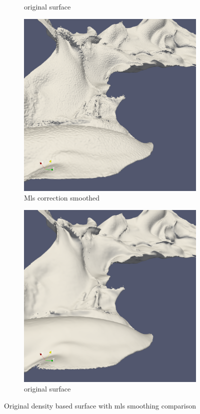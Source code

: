 \begin{figure}
\begin{center}
\begin{subfigure}[b]{0.47\textwidth}
			\caption{original surface}
		\end{subfigure}
		\begin{subfigure}[b]{0.47\textwidth}
			\includegraphics[width=\textwidth]{figures/CanionOriginal4.png}
			\caption{Mls correction smoothed}
		\end{subfigure}
		\begin{subfigure}[b]{0.47\textwidth}
			\includegraphics[width=\textwidth]{figures/CanionMls4.png}
			\caption{original surface}
		\end{subfigure}
	\end{center}
	\caption{Original density based surface with mls smoothing comparison} \label{fig:db_mls_reconstruction4}
\end{figure}
